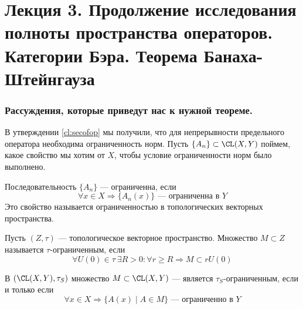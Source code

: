 \newpage
\section{Лекция 3. Продолжение исследования полноты пространства операторов. Категории Бэра. Теорема Банаха-Штейнгауза}
\subsubsection*{Рассуждения, которые приведут нас к нужной теореме.}
В утверждении \ref{cl:secofop} мы получили, что для непрерывности предельного оператора необходима ограниченность норм. Пусть $\{A_n\} \subset \CL(X,Y)$ поймем, какое свойство мы хотим от $X$, чтобы условие ограниченности норм было выполнено. 

Последовательность $\{A_n\}$ --- ограниченна, если
$$
\forall x \in X \Rightarrow \{A_n(x)\} \text{ --- ограниченна в $Y$}
$$
Это свойство называется ограниченностью в топологических векторных пространства. 
\begin{definition}
	Пусть $(Z, \tau)$ --- топологическое векторное пространство. Множество $M \subset Z$ называется $\tau$-ограниченным, если 
	$$
	\forall U(0) \in \tau \  \exists R > 0: \forall r  \geq R \Rightarrow M \subset r U(0)
	$$
\end{definition}
\begin{claim}
	В $(\CL(X, Y), \tau_S)$ множество $M \subset \CL(X, Y)$ --- является $\tau_S$-ограниченным, если и только если
	  $$
		\forall x \in X \Rightarrow \{A(x) \mid A \in M \} \text{ --- ограниченно в $Y$}
		$$
\end{claim}
